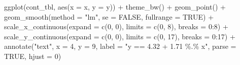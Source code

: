 \documentclass[
  letterpaper,
]{scrbook}
\newenvironment{Shaded}{\begin{snugshade}}{\end{snugshade}}
\newcommand{\AttributeTok}[1]{\textcolor[rgb]{0.40,0.45,0.13}{#1}}
\newcommand{\ConstantTok}[1]{\textcolor[rgb]{0.56,0.35,0.01}{#1}}
\newcommand{\DecValTok}[1]{\textcolor[rgb]{0.68,0.00,0.00}{#1}}
\newcommand{\FunctionTok}[1]{\textcolor[rgb]{0.28,0.35,0.67}{#1}}
\newcommand{\NormalTok}[1]{\textcolor[rgb]{0.00,0.23,0.31}{#1}}
\newcommand{\SpecialCharTok}[1]{\textcolor[rgb]{0.37,0.37,0.37}{#1}}
\newcommand{\StringTok}[1]{\textcolor[rgb]{0.13,0.47,0.30}{#1}}
\begin{document}
\begin{Shaded}
\begin{Highlighting}[]
\FunctionTok{ggplot}\NormalTok{(cont\_tbl, }\FunctionTok{aes}\NormalTok{(}\AttributeTok{x =}\NormalTok{ x, }\AttributeTok{y =}\NormalTok{ y)) }\SpecialCharTok{+}
  \FunctionTok{theme\_bw}\NormalTok{() }\SpecialCharTok{+}
  \FunctionTok{geom\_point}\NormalTok{() }\SpecialCharTok{+}
  \FunctionTok{geom\_smooth}\NormalTok{(}\AttributeTok{method =} \StringTok{"lm"}\NormalTok{, }\AttributeTok{se =} \ConstantTok{FALSE}\NormalTok{, }\AttributeTok{fullrange =} \ConstantTok{TRUE}\NormalTok{) }\SpecialCharTok{+}
  \FunctionTok{scale\_x\_continuous}\NormalTok{(}\AttributeTok{expand =} \FunctionTok{c}\NormalTok{(}\DecValTok{0}\NormalTok{, }\DecValTok{0}\NormalTok{), }\AttributeTok{limits =} \FunctionTok{c}\NormalTok{(}\DecValTok{0}\NormalTok{, }\DecValTok{8}\NormalTok{), }\AttributeTok{breaks =} \DecValTok{0}\SpecialCharTok{:}\DecValTok{8}\NormalTok{) }\SpecialCharTok{+} 
  \FunctionTok{scale\_y\_continuous}\NormalTok{(}\AttributeTok{expand =} \FunctionTok{c}\NormalTok{(}\DecValTok{0}\NormalTok{, }\DecValTok{0}\NormalTok{), }\AttributeTok{limits =} \FunctionTok{c}\NormalTok{(}\DecValTok{0}\NormalTok{, }\DecValTok{17}\NormalTok{), }\AttributeTok{breaks =} \DecValTok{0}\SpecialCharTok{:}\DecValTok{17}\NormalTok{) }\SpecialCharTok{+}
  \FunctionTok{annotate}\NormalTok{(}\StringTok{"text"}\NormalTok{, }\AttributeTok{x =} \DecValTok{4}\NormalTok{, }\AttributeTok{y =} \DecValTok{9}\NormalTok{, }\AttributeTok{label =} \StringTok{"y ==  4.32 + 1.71 \%.\% x"}\NormalTok{, }\AttributeTok{parse =} \ConstantTok{TRUE}\NormalTok{,}
           \AttributeTok{hjust =} \DecValTok{0}\NormalTok{)}
\end{Highlighting}
\end{Shaded}
\end{document}
